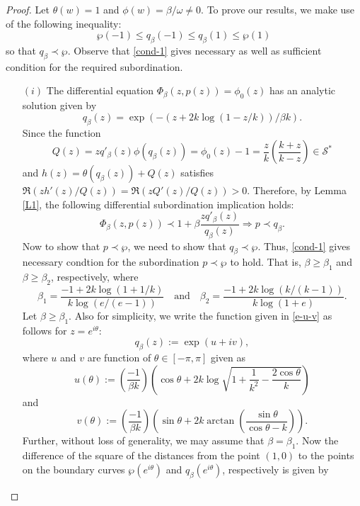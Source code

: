 \documentclass[12pt, reqno]{amsart}
\numberwithin{equation}{section}
\theoremstyle{plain}
\theoremstyle{definition}
\theoremstyle{remark}
\begin{document}
\begin{proof}
	Let $\theta(w)=1$ and $\phi(w)={\beta}/{\omega}\neq0$. To prove our results, we make use of the following inequality: 
	\begin{equation}\label{cond-1}
	\wp(-1)\leq q_{\beta}(-1)\leq q_{\beta}(1)\leq \wp(1)
	\end{equation} 
	so that $q_{\beta}\prec \wp$. Observe that \eqref{cond-1} gives necessary as well as sufficient condition for the required subordination.
	\begin{itemize}
		\item [$(i)$] The differential equation $\Phi_\beta(z, p(z))=\phi_0(z)$ has an analytic solution given by
		\begin{equation}\label{e-u-v}
		q_{\beta}(z)=\exp\left(-(z+2k\log(1-z/k))/\beta k\right).
		\end{equation}
		Since the function 
		$$Q(z)=zq'_{\beta}(z)\phi(q_{\beta}(z))=\phi_0(z)-1=\frac{z}{k}\left(\frac{k+z}{k-z}\right)\in\mathcal{S}^{*}$$ 
		and	$h(z)=\theta(q_{\beta}(z))+Q(z)$ satisfies  
		$\Re(zh'(z)/Q(z))=\Re(zQ'(z)/Q(z))>0.$ 
		Therefore, by Lemma \ref{L1}, the following differential subordination implication holds:
		$$\Phi_\beta(z, p(z))\prec 1+\beta \frac{zq'_{\beta}(z)}{q_{\beta}(z)}\Rightarrow p\prec q_{\beta}.$$
		Now to show that $p\prec \wp$, we need to show that $q_{\beta}\prec\wp$. Thus, \eqref{cond-1} gives necessary condtion for the subordination $p\prec \wp$ to hold. That is,
		$\beta\geq\beta_1$ and $\beta\geq\beta_2$, respectively, where
		$$\beta_1= \frac{-1+2k\log(1+1/k)}{k\log(e/(e-1))}\quad\text{and}\quad \beta_2=\frac{-1+2k\log(k/(k-1))}{k\log(1+e)}.$$
		Let $\beta\geq \beta_1$. Also for simplicity, we write the function given in \eqref{e-u-v} as follows for $z=e^{i\theta}$:
		\begin{equation*}
		q_{\beta}(z):=\exp(u+iv),
		\end{equation*}
		where $u$ and $v$ are function of $\theta\in[-\pi,\pi]$ given as
		\begin{equation*}
		u(\theta):=\left(\frac{-1}{\beta k}\right)\left(\cos\theta+ 2k\log{\sqrt{1+\frac{1}{k^2}-\frac{2\cos\theta}{k}}}\right)
		\end{equation*}
		and
		\begin{equation*}
		v(\theta):=\left(\frac{-1}{\beta k}\right)\left(\sin\theta+ 2k\arctan\left(\frac{\sin\theta}{\cos\theta-k}\right)\right).
		\end{equation*}
		Further, without loss of generality, we may assume that $\beta=\beta_1$. Now the difference of the square of the distances from the point $(1,0)$ to the points on the boundary curves  $\wp(e^{i\theta})$ and $q_{\beta}( e^{i\theta})$, respectively is given by

\end{itemize}
\end{proof}
\end{document}
